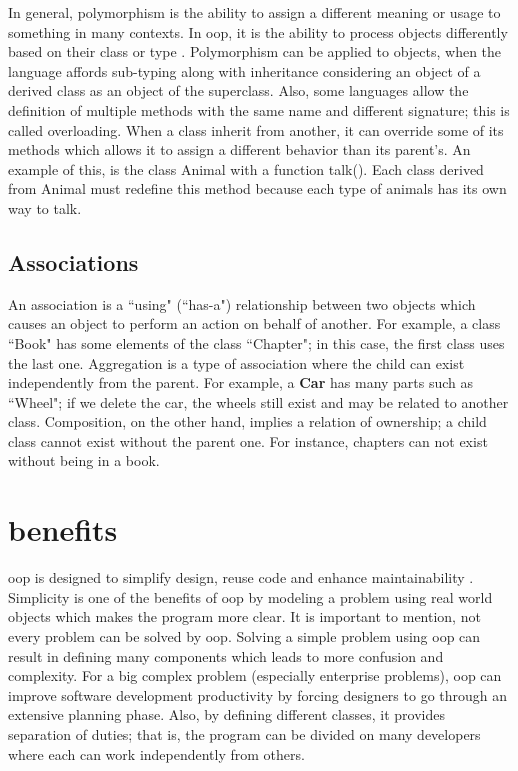 \documentclass[12pt]{book}
\begin{document}
In general, polymorphism is the ability to assign a different meaning or usage to something in many contexts. 
In \ac{oop}, it is the ability to process objects differently based on their class or type \citep{2016-techdifferences}. 
Polymorphism can be applied to objects, when the language affords sub-typing along with inheritance considering an object of a derived class as an object of the superclass. 
Also, some languages allow the definition of multiple methods with the same name and different signature; this is called overloading.
When a class inherit from another, it can override some of its methods which allows it to assign a different behavior than its parent's.
An example of this, is the class Animal with a function talk(). 
Each class derived from Animal must redefine this method because each type of animals has its own way to talk.


\subsection{Associations}

An association is a ``using" (``has-a") relationship between two objects which causes an object to perform an action on behalf of another. 
For example, a class ``Book" has some elements of the class ``Chapter"; in this case, the first class uses the last one.
Aggregation is a type of association where the child can exist independently from the parent.
For example, a \textbf{Car} has many parts such as ``Wheel"; if we delete the car, the wheels still exist and may be related to another class. 
Composition, on the other hand, implies a relation of ownership; a child class cannot exist without the parent one.
For instance, chapters can not exist without being in a book.

\section{benefits}


\ac{oop} is designed to simplify design, reuse code and enhance maintainability \citep{2017-half,2015-popyack-boady}.
Simplicity is one of the benefits of \ac{oop} by modeling a problem using real world objects which makes the program more clear.
It is important to mention, not every problem can be solved by \ac{oop}. 
Solving a simple problem using \ac{oop} can result in defining many components which leads to more confusion and complexity. 
For a big complex problem (especially enterprise problems), \ac{oop} can improve software development productivity by forcing designers to go through an extensive planning phase. 
Also, by defining different classes, it provides separation of duties; that is, the program can be divided on many developers where each can work independently from others.
\end{document}
